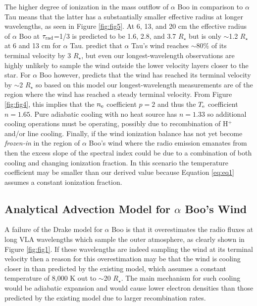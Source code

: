 \documentclass[iop]{emulateapj}
\begin{document}
The higher degree of ionization in the mass outflow of $\alpha$ Boo in comparison to $\alpha$ Tau means that the latter has a substantially smaller effective radius at longer wavelengths, as seen in Figure \ref{fig:fig5}. At 6, 13, and 20 cm the effective radius of $\alpha$ Boo at $\tau _{\rm{rad}}$=1/3 is predicted to be 1.6, 2.8, and 3.7 $R_{\star}$ but is only $\sim$1.2 $R_{\star}$ at 6 and 13 cm for $\alpha$ Tau. \cite{1998ApJ...503..396R} predict that $\alpha$ Tau's wind reaches $\sim$80\% of its terminal velocity by 3 $R_{\star}$, but even our longest-wavelength observations are highly unlikely to sample the wind outside the lower velocity layers closer to the star. For $\alpha$ Boo however, \cite{1985pssl.proc..351D} predicts that the wind has reached its terminal velocity by $\sim$2 $R_{\star}$ so based on this model our longest-wavelength measurements are of the region where the wind has reached a steady terminal velocity. From Figure \ref{fig:fig4}, this implies that the $n_{\rm{e}}$ coefficient $p=2$ and thus the $T_{\rm{e}}$ coefficient $n=1.65$. Pure adiabatic cooling with no heat source has $n=1.33$ so additional cooling operations must be operating, possibly due to recombination of H$^{+}$ and/or line cooling. Finally, if the wind ionization balance has not yet become \textit{frozen-in} in the region of $\alpha$ Boo's wind where the radio emission emanates from then the excess slope of the spectral index could be due to a combination of both cooling and changing ionization fraction. In this scenario the temperature coefficient may be smaller than our derived value because Equation \ref{eq:eq1} assumes a constant ionization fraction.

\subsection{Analytical Advection Model for $\alpha$ Boo's Wind} \label{disc:disc4}

A failure of the Drake model for $\alpha$ Boo is that it overestimates the radio fluxes at long VLA wavelengths which sample the outer atmosphere, as clearly shown in Figure \ref{fig:fig1}. If these wavelengths are indeed sampling the wind at its terminal velocity then a reason for this overestimation may be that the wind is cooling closer in than predicted by the existing model, which assumes a constant temperature of 8,000 K out to $\sim$20 $R_{\star}$. The main mechanism for such cooling would be adiabatic expansion \citep{2011ASPC..448..691O} and would cause lower electron densities than those predicted by the existing model due to larger recombination rates. 
\end{document}
